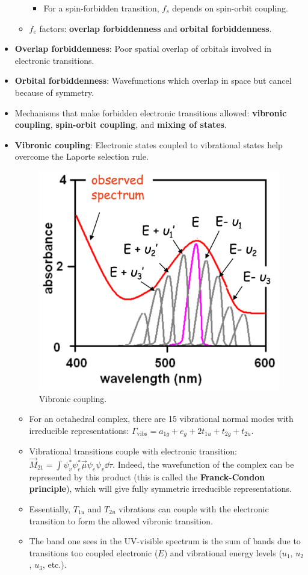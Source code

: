 \documentclass[../notes.tex]{subfiles}
\begin{document}
\begin{itemize}
\begin{itemize}
\begin{itemize}
            \item For a spin-forbidden transition, $f_s$ depends on spin-orbit coupling.
        \end{itemize}
        \item $f_e$ factors: \textbf{overlap forbiddenness} and \textbf{orbital forbiddenness}.
    \end{itemize}
    \item \textbf{Overlap forbiddenness}: Poor spatial overlap of orbitals involved in electronic transitions.
    \item \textbf{Orbital forbiddenness}: Wavefunctions which overlap in space but cancel because of symmetry.
    \item Mechanisms that make forbidden electronic transitions allowed: \textbf{vibronic coupling}, \textbf{spin-orbit coupling}, and \textbf{mixing of states}.
    \item \textbf{Vibronic coupling}: Electronic states coupled to vibrational states help overcome the Laporte selection rule.
    \begin{figure}[h!]
        \centering
        \includegraphics[width=0.3\linewidth]{../ExtFiles/vibronicCoupling.png}
        \caption{Vibronic coupling.}
        \label{fig:vibronicCoupling}
    \end{figure}
    \begin{itemize}
        \item For an octahedral complex, there are 15 vibrational normal modes with irreducible representations: $\Gamma_\text{vibs}=a_{1g}+e_g+2t_{1u}+t_{2g}+t_{2u}$.
        \item Vibrational transitions couple with electronic transition: $\vec{M}_{21}=\int\psi_v^*\psi_e^*\vec{\mu}\psi_e\psi_v\dd{\tau}$. Indeed, the wavefunction of the complex can be represented by this product (this is called the \textbf{Franck-Condon principle}), which will give fully symmetric irreducible representations.
        \item Essentially, $T_{1u}$ and $T_{2u}$ vibrations can couple with the electronic transition to form the allowed vibronic transition.
        \item The band one sees in the UV-visible spectrum is the sum of bands due to transitions too coupled electronic ($E$) and vibrational energy levels ($u_1$, $u_2$, $u_3$, etc.).

\end{itemize}
\end{itemize}
\end{document}
